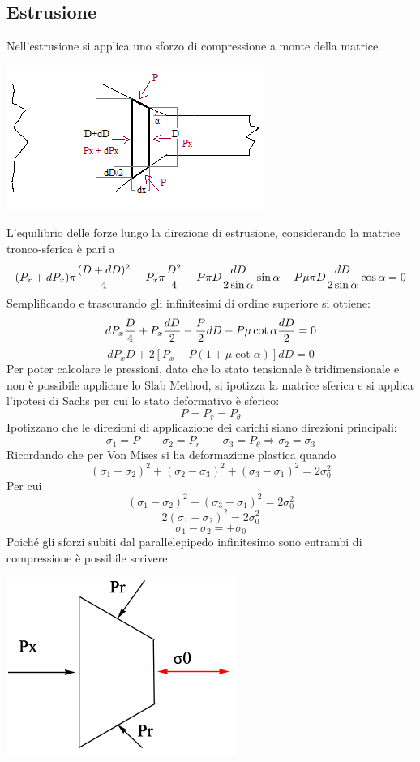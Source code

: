 \documentclass[a4paper, 15pt]{article}
\begin{document}
	\subsection{Estrusione}
	Nell'estrusione si applica uno sforzo di compressione a monte della matrice
\begin{center}
	\includegraphics[width=0.8\linewidth]{figures/def11}
\end{center}
	L'equilibrio delle forze lungo la direzione di estrusione, considerando la matrice tronco-sferica è pari a
	\[(P_x+dP_x)\pi\dfrac{(D+dD)^2}{4} - P_x\pi{D^2\over4} - P\pi D\dfrac{dD}{2\sin\alpha}\sin\alpha-P\mu\pi D\dfrac{dD}{2\sin\alpha}\cos\alpha=0\]
	Semplificando e trascurando gli infinitesimi di ordine superiore si ottiene:
	\[dP_x{D\over4} + P_x{dD\over2}-{P\over2}dD - P\mu\cot\alpha{dD\over2} = 0\]
	\begin{equation}\label{eq:7}
		dP_xD + 2[P_x-P(1+\mu\cot\alpha)]dD=0
	\end{equation}
	Per poter calcolare le pressioni, dato che lo stato tensionale è tridimensionale e non è possibile applicare lo Slab Method, si ipotizza la matrice sferica e si applica l'ipotesi di Sachs per cui lo stato deformativo è sferico:
	\[P = P_r = P_\theta\]
	Ipotizzano che le direzioni di applicazione dei carichi siano direzioni principali:
	\[\sigma_1 = P\qquad\sigma_2 = P_r\qquad\sigma_3=P_\theta \Rightarrow \sigma_2=\sigma_3\]
	Ricordando che per Von Mises si ha deformazione plastica quando 
	\[(\sigma_1-\sigma_2)^2+(\sigma_2-\sigma_3)^2+(\sigma_3-\sigma_1)^2 = 2\sigma^2_0\]
	Per cui
	\[(\sigma_1-\sigma_2)^2+(\sigma_3-\sigma_1)^2 = 2\sigma^2_0\]
	\[2(\sigma_1-\sigma_2)^2 = 2\sigma^2_0\]
\begin{equation}\label{eq:6}
	\boxed{	\sigma_1-\sigma_2 = \pm\sigma_0}
\end{equation}
	Poiché gli sforzi subiti dal parallelepipedo infinitesimo sono entrambi di compressione è possibile scrivere
\begin{center}
	\includegraphics[width=0.5\linewidth]{figures/def11.1}
\end{center}	
\end{document}

